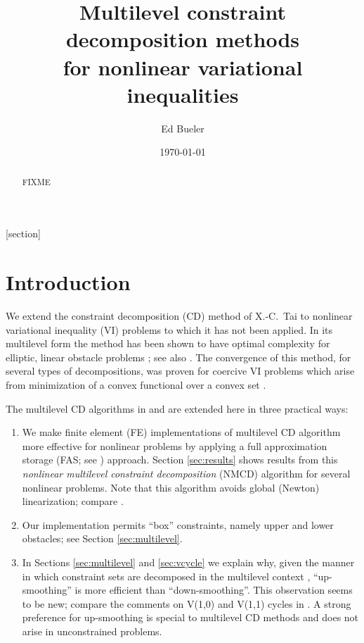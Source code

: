 \documentclass[letterpaper,final,12pt,reqno]{amsart}
\theoremstyle{cstyle}
\theoremstyle{cstyle*}
\theoremstyle{dstyle}
\numberwithin{equation}{section}
\numberwithin{figure}{section}
\numberwithin{table}{section}
\numberwithin{theorem}{section}
\begin{document}
\title[Multilevel constraint decomposition methods]{Multilevel constraint decomposition methods \\ for nonlinear variational inequalities}

\author{Ed Bueler}

\date{\today}

\begin{abstract} FIXME
\end{abstract}

\maketitle


\thispagestyle{empty}

[section]


\section{Introduction} \label{sec:intro}

We extend the constraint decomposition (CD) method of X.-C.~Tai \cite{Tai2003} to nonlinear variational inequality (VI) problems to which it has not been applied.  In its multilevel form the method has been shown to have optimal complexity for elliptic, linear obstacle problems \cite[Subsection 5.4]{Tai2003}; see also \cite[Theorem 4.6 and Algorithm 4.7]{GraeserKornhuber2009}.  The convergence of this method, for several types of decompositions, was proven for coercive VI problems which arise from minimization of a convex functional over a convex set \cite{Tai2003}.

The multilevel CD algorithms in \cite{GraeserKornhuber2009} and \cite{Tai2003} are extended here in three practical ways:
\renewcommand{\labelenumi}{\emph{(\roman{enumi})}}
\begin{enumerate}
\item We make finite element (FE) implementations of multilevel CD algorithm more effective for nonlinear problems by applying a full approximation storage (FAS; see \cite{Brandt1977,Bruneetal2015}) approach.  Section \ref{sec:results} shows results from this \emph{nonlinear multilevel constraint decomposition} (NMCD) algorithm  for several nonlinear problems.  Note that this algorithm avoids global (Newton) linearization; compare \cite{GraeserKornhuber2009}.
\item Our implementation permits ``box'' constraints, namely upper and lower obstacles; see Section \ref{sec:multilevel}.
\item In Sections \ref{sec:multilevel} and \ref{sec:vcycle} we explain why, given the manner in which constraint sets are decomposed in the multilevel context \cite{GraeserKornhuber2009}, ``up-smoothing'' is more efficient than ``down-smoothing''.  This observation seems to be new; compare the comments on V(1,0) and V(1,1) cycles in \cite{GraeserKornhuber2009,Tai2003}.  A strong preference for up-smoothing is special to multilevel CD methods and does not arise in unconstrained problems.
\end{enumerate}
\end{document}
